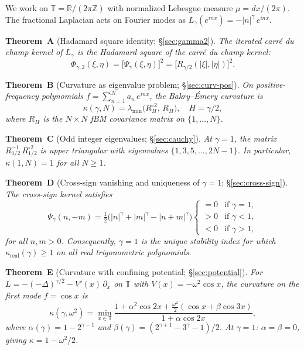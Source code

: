 \documentclass[11pt,a4paper]{article}
\theoremstyle{plain}
\theoremstyle{definition}
\theoremstyle{remark}
\newcommand{\R}{\mathbb{R}}
\newcommand{\Z}{\mathbb{Z}}
\newcommand{\T}{\mathbb{T}}
\begin{document}
We work on $\T = \R/(2\pi\Z)$ with normalized Lebesgue measure
$\mu = dx/(2\pi)$. The fractional Laplacian acts on Fourier modes as
$L_\gamma(e^{inx}) = -|n|^\gamma\,e^{inx}$.

\medskip\noindent
\textbf{Theorem~A} (Hadamard square identity; \S\ref{sec:gamma2}).
\emph{The iterated carr\'e du champ kernel of $L_\gamma$ is the
Hadamard square of the carr\'e du champ kernel:
\begin{equation}\label{eq:intro-A}
  \Phi_{\gamma,2}(\xi,\eta)
  = \bigl[\Psi_\gamma(\xi,\eta)\bigr]^2
  = \bigl[R_{\gamma/2}(|\xi|,|\eta|)\bigr]^2.
\end{equation}}

\medskip\noindent
\textbf{Theorem~B} (Curvature as eigenvalue problem; \S\ref{sec:curv-pos}).
\emph{On positive-frequency polynomials $f = \sum_{n=1}^N a_n\,e^{inx}$,
the Bakry--\'Emery curvature is
\begin{equation}\label{eq:intro-B}
  \kappa(\gamma, N) = \lambda_{\min}\!\bigl(R_H^{\circ 2},\, R_H\bigr),
  \quad H = \gamma/2,
\end{equation}
where $R_H$ is the $N \times N$ fBM covariance matrix on $\{1,\ldots,N\}$.}

\medskip\noindent
\textbf{Theorem~C} (Odd integer eigenvalues; \S\ref{sec:cauchy}).
\emph{At $\gamma = 1$, the matrix $R_{1/2}^{-1}\,R_{1/2}^{\circ 2}$ is
upper triangular with eigenvalues $\{1, 3, 5, \ldots, 2N-1\}$.
In particular, $\kappa(1,N) = 1$ for all $N \geq 1$.}

\medskip\noindent
\textbf{Theorem~D} (Cross-sign vanishing and uniqueness of $\gamma=1$; \S\ref{sec:cross-sign}).
\emph{The cross-sign kernel satisfies
\begin{equation}\label{eq:intro-D}
  \Psi_\gamma(n,-m) = \tfrac{1}{2}\bigl(|n|^\gamma + |m|^\gamma
  - |n+m|^\gamma\bigr)
  \begin{cases}
    = 0 & \text{if } \gamma = 1, \\
    > 0 & \text{if } \gamma < 1, \\
    < 0 & \text{if } \gamma > 1,
  \end{cases}
\end{equation}
for all $n,m > 0$. Consequently, $\gamma = 1$ is the unique stability
index for which $\kappa_{\mathrm{real}}(\gamma) \geq 1$ on all real
trigonometric polynomials.}

\medskip\noindent
\textbf{Theorem~E} (Curvature with confining potential; \S\ref{sec:potential}).
\emph{For $L = -(-\Delta)^{\gamma/2} - V'(x)\,\partial_x$ on $\T$ with
$V(x) = -\omega^2\cos x$, the curvature on the first mode
$f = \cos x$ is
\begin{equation}\label{eq:intro-E}
  \kappa(\gamma,\omega^2) = \min_{x \in \T}
  \frac{1 + \alpha^2\cos 2x + \tfrac{\omega^2}{2}(\cos x + \beta\cos 3x)}
       {1 + \alpha\cos 2x},
\end{equation}
where $\alpha(\gamma) = 1 - 2^{\gamma-1}$ and
$\beta(\gamma) = (2^{\gamma+1} - 3^\gamma - 1)/2$.
At $\gamma = 1$: $\alpha = \beta = 0$, giving $\kappa = 1 - \omega^2/2$.}
\end{document}
